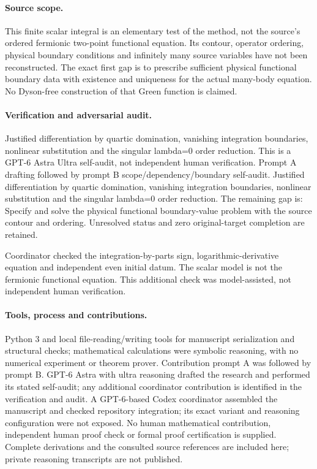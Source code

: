 \documentclass[11pt]{article}
\begin{document}
\paragraph{Source scope.} This finite scalar integral is an elementary test of the method, not the source's ordered fermionic two-point functional equation. Its contour, operator ordering, physical boundary conditions and infinitely many source variables have not been reconstructed. The exact first gap is to prescribe sufficient physical functional boundary data with existence and uniqueness for the actual many-body equation. No Dyson-free construction of that Green function is claimed.

\paragraph{Verification and adversarial audit.}
Justified differentiation by quartic domination, vanishing integration boundaries, nonlinear substitution and the singular lambda=0 order reduction. This is a GPT-6 Astra Ultra self-audit, not independent human verification. Prompt A drafting followed by prompt B scope/dependency/boundary self-audit. Justified differentiation by quartic domination, vanishing integration boundaries, nonlinear substitution and the singular lambda=0 order reduction. The remaining gap is: Specify and solve the physical functional boundary-value problem with the source contour and ordering. Unresolved status and zero original-target completion are retained.

Coordinator checked the integration-by-parts sign, logarithmic-derivative equation and independent even initial datum. The scalar model is not the fermionic functional equation. This additional check was model-assisted, not independent human verification.

\paragraph{Tools, process and contributions.}
Python 3 and local file-reading/writing tools for manuscript serialization and structural checks; mathematical calculations were symbolic reasoning, with no numerical experiment or theorem prover. Contribution prompt A was followed by prompt B. GPT-6 Astra with ultra reasoning drafted the research and performed its stated self-audit; any additional coordinator contribution is identified in the verification and audit. A GPT-6-based Codex coordinator assembled the manuscript and checked repository integration; its exact variant and reasoning configuration were not exposed. No human mathematical contribution, independent human proof check or formal proof certification is supplied. Complete derivations and the consulted source references are included here; private reasoning transcripts are not published.
\end{document}
